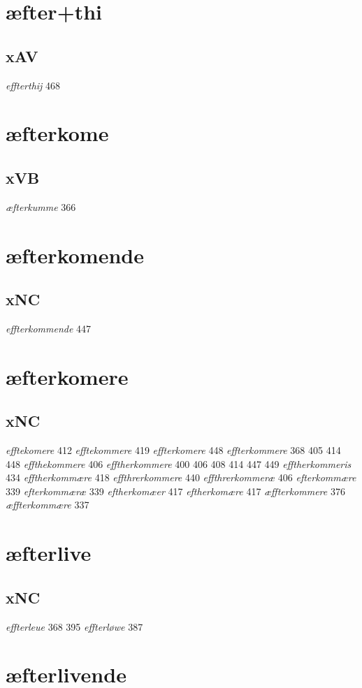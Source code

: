 \documentclass[a4paper,twocolumn]{article}
\begin{document}
\section{æfter+thi}
\label{sec:orgf748795}
\subsection{xAV}
\label{sec:orgfd8aace}
\emph{effterthij} 468 
\section{æfterkome}
\label{sec:org5e152c6}
\subsection{xVB}
\label{sec:org87eebe4}
\emph{æfterkumme} 366 
\section{æfterkomende}
\label{sec:org8d6c109}
\subsection{xNC}
\label{sec:orgbf2101e}
\emph{effterkommende} 447 
\section{æfterkomere}
\label{sec:org5ab7e90}
\subsection{xNC}
\label{sec:orgc5bd0a5}
\emph{efftekomere} 412 \emph{efftekommere} 419 \emph{effterkomere} 448 \emph{effterkommere} 368 405 414 448 \emph{effthekommere} 406 \emph{efftherkommere} 400 406 408 414 447 449 \emph{efftherkommeris} 434 \emph{efftherkommære} 418 \emph{effthrerkommere} 440 \emph{effthrerkommeræ} 406 \emph{efterkommære} 339 \emph{efterkommæræ} 339 \emph{eftherkomæer} 417 \emph{eftherkomære} 417 \emph{æffterkommere} 376 \emph{æffterkommære} 337 
\section{æfterlive}
\label{sec:org6d72495}
\subsection{xNC}
\label{sec:org88db502}
\emph{effterleue} 368 395 \emph{effterløwe} 387 
\section{æfterlivende}
\label{sec:org5404642}
\end{document}
